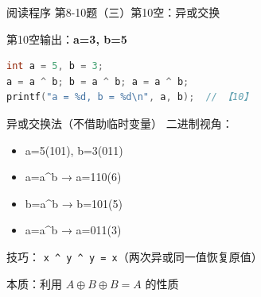 \begin{frame}[fragile]{阅读程序 第8-10题（三）}{第10空：异或交换}
    \begin{exampleblock}{第10空输出：\textbf{a=3, b=5}}
    \end{exampleblock}
    \begin{lstlisting}[language=C]
int a = 5, b = 3;
a = a ^ b; b = a ^ b; a = a ^ b;
printf("a = %d, b = %d\n", a, b);  // 【10】
\end{lstlisting}
    \pause
    \begin{alertblock}{异或交换法（不借助临时变量）}
        \small 二进制视角：
        \begin{itemize}
            \item a=5(101), b=3(011)
            \item a=a\^{}b → a=110(6)
            \item b=a\^{}b → b=101(5)
            \item a=a\^{}b → a=011(3)
        \end{itemize}
        {\color{highlight}技巧：} \texttt{x \^{} y \^{} y = x}（两次异或同一值恢复原值）

        本质：利用 $A \oplus B \oplus B = A$ 的性质
    \end{alertblock}
\end{frame}
